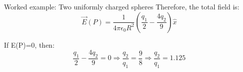 {\begin{frame}{Worked example: Two uniformly charged spheres}
  Therefore, the total field is:
  \begin{equation*}
    \vec{E}(P) = \frac{1}{4 \pi \epsilon_0 R^2} (\frac{q_1}{2} - \frac{4q_2}{9}) \hat{x}
  \end{equation*}

  If E(P)=0, then:
  \begin{equation*}
  	\frac{q_1}{2} - \frac{4q_2}{9} = 0 \Rightarrow
    \frac{q_2}{q_1} = \frac{9}{8} \Rightarrow
  	\frac{q_2}{q_1} = 1.125
  \end{equation*}

\end{frame}


} %



%
%

